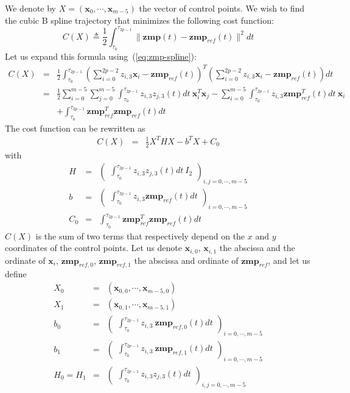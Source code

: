 \documentclass {article}
\newcommand\x{\mathbf{x}}
\newcommand\z{z}
\newcommand\zmp{\mathbf{zmp}}
\newcommand\zmpref{\mathbf{zmp}_{ref}}
\newcommand\zmprefx{\mathbf{zmp}_{ref, 0}}
\newcommand\zmprefy{\mathbf{zmp}_{ref, 1}}
\begin{document}
We denote by $X=(\x_0, \cdots, \x_{m-5})$ the vector of control points.
We wish to find the cubic B spline trajectory that minimizes the
following cost function:
\begin{equation}\label{eq:qudratic-cost}
C(X) \triangleq \frac{1}{2}\int_{\tau_0}^{\tau_{2p-1}} \|\zmp (t) - \zmpref (t)\|^2 dt
\end{equation}
Let us expand this formula using~(\ref{eq:zmp-spline}):
\begin{eqnarray*}
C(X) &=& \frac{1}{2}\int_{\tau_0}^{\tau_{2p-1}} (\sum_{i=0}^{2p-2} \z_{i,3} \x_{i} - \zmpref (t))^T(\sum_{i=0}^{2p-2} \z_{i,3} \x_{i} - \zmpref (t)) dt\\
&=& \frac{1}{2}\sum_{i=0}^{m-5}\sum_{j=0}^{m-5}\int_{\tau_0}^{\tau_{2p-1}} \z_{i,3} \z_{j,3} (t) dt\  \x_i^T\x_j - \sum_{i=0}^{m-5}\int_{\tau_0}^{\tau_{2p-1}}\z_{i,3}\zmpref^T(t)dt\ \x_i\\
&&+ \int_{\tau_0}^{\tau_{2p-1}} \zmpref^T\zmpref (t)dt
\end{eqnarray*}
The cost function can be rewritten as
\begin{eqnarray*}
C(X) &=& \frac{1}{2}X^THX - b^T X + C_0
\end{eqnarray*}
with
\begin{eqnarray*}
H &=& \left(\begin{array}{c}
\int_{\tau_0}^{\tau_{2p-1}} \z_{i,3} \z_{j,3}(t)dt\ I_2 \end{array}\right)_{i,j=0,\cdots,m-5} \\
b &=& \left(\begin{array}{c}\int_{\tau_0}^{\tau_{2p-1}}\z_{i,3}\zmpref(t)dt\end{array}\right)_{i=0,\cdots,m-5}\\
C_0 &=&\int_{\tau_0}^{\tau_{2p-1}} \zmpref^T\zmpref (t)dt
\end{eqnarray*}
$C(X)$ is the sum of two terms that respectively depend on the $x$ and $y$
coordinates of the control points. Let us denote $\x_{i,0}$, $\x_{i,1}$ the abscissa and the ordinate of $\x_i$, $\zmprefx$, $\zmprefy$ the abscissa and ordinate of $\zmpref$, and let us define
\begin{eqnarray*}
  X_0 &=& (\x_{0,0},\cdots,\x_{m-5,0}) \\
  X_1 &=& (\x_{0,1},\cdots,\x_{m-5,1}) \\
  b_0 &=& \left(\begin{array}{c}\int_{\tau_0}^{\tau_{2p-1}}\z_{i,3}\ \zmprefx(t)dt\end{array}\right)_{i=0,\cdots,m-5}\\
  b_1 &=& \left(\begin{array}{c}\int_{\tau_0}^{\tau_{2p-1}}\z_{i,3}\ \zmprefy(t)dt\end{array}\right)_{i=0,\cdots,m-5}\\
  H_0 = H_1 &=& \left(\begin{array}{c}
    \int_{\tau_0}^{\tau_{2p-1}} \z_{i,3} \z_{j,3}(t)dt \end{array}\right)_{i,j=0,\cdots,m-5} \\
\end{eqnarray*}
\end{document}
